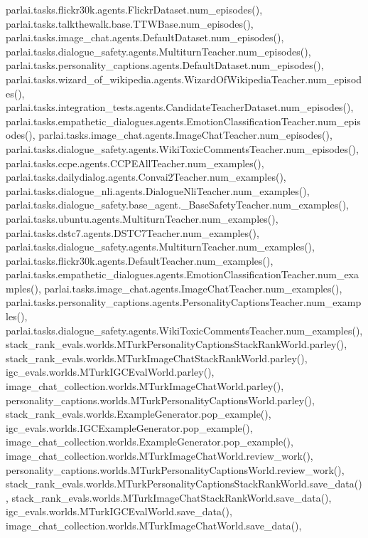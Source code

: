 parlai.\+tasks.\+flickr30k.\+agents.\+Flickr\+Dataset.\+num\+\_\+episodes(), parlai.\+tasks.\+talkthewalk.\+base.\+T\+T\+W\+Base.\+num\+\_\+episodes(), parlai.\+tasks.\+image\+\_\+chat.\+agents.\+Default\+Dataset.\+num\+\_\+episodes(), parlai.\+tasks.\+dialogue\+\_\+safety.\+agents.\+Multiturn\+Teacher.\+num\+\_\+episodes(), parlai.\+tasks.\+personality\+\_\+captions.\+agents.\+Default\+Dataset.\+num\+\_\+episodes(), parlai.\+tasks.\+wizard\+\_\+of\+\_\+wikipedia.\+agents.\+Wizard\+Of\+Wikipedia\+Teacher.\+num\+\_\+episodes(), parlai.\+tasks.\+integration\+\_\+tests.\+agents.\+Candidate\+Teacher\+Dataset.\+num\+\_\+episodes(), parlai.\+tasks.\+empathetic\+\_\+dialogues.\+agents.\+Emotion\+Classification\+Teacher.\+num\+\_\+episodes(), parlai.\+tasks.\+image\+\_\+chat.\+agents.\+Image\+Chat\+Teacher.\+num\+\_\+episodes(), parlai.\+tasks.\+dialogue\+\_\+safety.\+agents.\+Wiki\+Toxic\+Comments\+Teacher.\+num\+\_\+episodes(), parlai.\+tasks.\+ccpe.\+agents.\+C\+C\+P\+E\+All\+Teacher.\+num\+\_\+examples(), parlai.\+tasks.\+dailydialog.\+agents.\+Convai2\+Teacher.\+num\+\_\+examples(), parlai.\+tasks.\+dialogue\+\_\+nli.\+agents.\+Dialogue\+Nli\+Teacher.\+num\+\_\+examples(), parlai.\+tasks.\+dialogue\+\_\+safety.\+base\+\_\+agent.\+\_\+\+Base\+Safety\+Teacher.\+num\+\_\+examples(), parlai.\+tasks.\+ubuntu.\+agents.\+Multiturn\+Teacher.\+num\+\_\+examples(), parlai.\+tasks.\+dstc7.\+agents.\+D\+S\+T\+C7\+Teacher.\+num\+\_\+examples(), parlai.\+tasks.\+dialogue\+\_\+safety.\+agents.\+Multiturn\+Teacher.\+num\+\_\+examples(), parlai.\+tasks.\+flickr30k.\+agents.\+Default\+Teacher.\+num\+\_\+examples(), parlai.\+tasks.\+empathetic\+\_\+dialogues.\+agents.\+Emotion\+Classification\+Teacher.\+num\+\_\+examples(), parlai.\+tasks.\+image\+\_\+chat.\+agents.\+Image\+Chat\+Teacher.\+num\+\_\+examples(), parlai.\+tasks.\+personality\+\_\+captions.\+agents.\+Personality\+Captions\+Teacher.\+num\+\_\+examples(), parlai.\+tasks.\+dialogue\+\_\+safety.\+agents.\+Wiki\+Toxic\+Comments\+Teacher.\+num\+\_\+examples(), stack\+\_\+rank\+\_\+evals.\+worlds.\+M\+Turk\+Personality\+Captions\+Stack\+Rank\+World.\+parley(), stack\+\_\+rank\+\_\+evals.\+worlds.\+M\+Turk\+Image\+Chat\+Stack\+Rank\+World.\+parley(), igc\+\_\+evals.\+worlds.\+M\+Turk\+I\+G\+C\+Eval\+World.\+parley(), image\+\_\+chat\+\_\+collection.\+worlds.\+M\+Turk\+Image\+Chat\+World.\+parley(), personality\+\_\+captions.\+worlds.\+M\+Turk\+Personality\+Captions\+World.\+parley(), stack\+\_\+rank\+\_\+evals.\+worlds.\+Example\+Generator.\+pop\+\_\+example(), igc\+\_\+evals.\+worlds.\+I\+G\+C\+Example\+Generator.\+pop\+\_\+example(), image\+\_\+chat\+\_\+collection.\+worlds.\+Example\+Generator.\+pop\+\_\+example(), image\+\_\+chat\+\_\+collection.\+worlds.\+M\+Turk\+Image\+Chat\+World.\+review\+\_\+work(), personality\+\_\+captions.\+worlds.\+M\+Turk\+Personality\+Captions\+World.\+review\+\_\+work(), stack\+\_\+rank\+\_\+evals.\+worlds.\+M\+Turk\+Personality\+Captions\+Stack\+Rank\+World.\+save\+\_\+data(), stack\+\_\+rank\+\_\+evals.\+worlds.\+M\+Turk\+Image\+Chat\+Stack\+Rank\+World.\+save\+\_\+data(), igc\+\_\+evals.\+worlds.\+M\+Turk\+I\+G\+C\+Eval\+World.\+save\+\_\+data(), image\+\_\+chat\+\_\+collection.\+worlds.\+M\+Turk\+Image\+Chat\+World.\+save\+\_\+data(), 